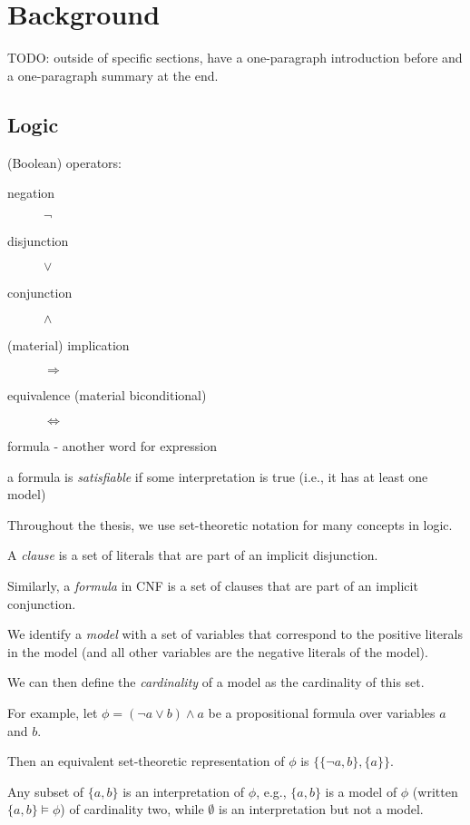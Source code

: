 \chapter{Background}

TODO: outside of specific sections, have a one-paragraph introduction before and a one-paragraph summary at the end.

\section{Logic}

(Boolean) operators:
\begin{description}
\item[negation] $\neg$
\item[disjunction] $\lor$
\item[conjunction] $\land$
\item[(material) implication] $\Rightarrow$
\item[equivalence (material biconditional)] $\Leftrightarrow$
\end{description}

formula - another word for expression

a formula is \emph{satisfiable} if some interpretation is true (i.e., it has at least one model)

Throughout the thesis, we use set-theoretic notation for many concepts in logic.

A \emph{clause} is a set of literals that are part of an implicit disjunction.

Similarly, a \emph{formula} in CNF is a set of clauses that are part of an implicit conjunction.

We identify a \emph{model} with a set of variables that correspond to the positive literals in the model (and all other variables are the negative literals of the model).

We can then define the \emph{cardinality} of a model as the cardinality of this set.

For example, let $\phi = (\neg a \lor b) \land a$ be a propositional formula over variables $a$ and $b$.

Then an equivalent set-theoretic representation of $\phi$ is $\{ \{\neg a, b \}, \{ a \} \}$.

Any subset of $\{ a, b \}$ is an interpretation of $\phi$, e.g., $\{ a, b \}$ is a model of $\phi$ (written $\{ a, b \} \models \phi$) of cardinality two, while $\emptyset$ is an interpretation but not a model.

